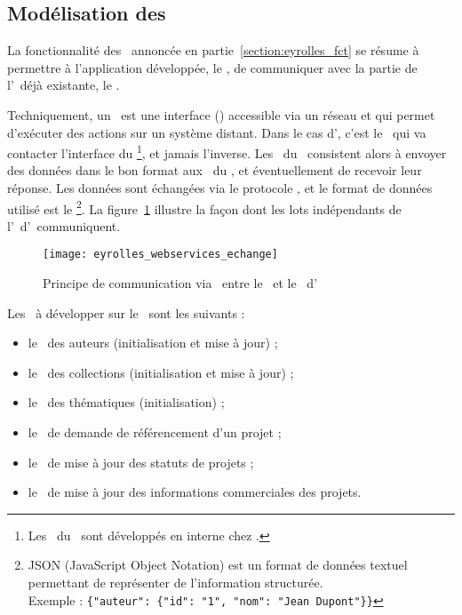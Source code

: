 \subsection{Modélisation des \awss}

La fonctionnalité des \awss\ annoncée en partie~\ref{section:eyrolles_fct} se résume à permettre à l'application développée, le \alotdeux, de communiquer avec la partie de l'\aintranet\ déjà existante, le \alotun.

Techniquement, un \aws\ est une interface (\aapi) accessible via un réseau et qui permet d'exécuter des actions sur un système distant. Dans le cas d'\aey, c'est le \alotdeux\ qui va contacter l'interface du \alotun\footnote{Les \awss\ du \alotun\ sont développés en interne chez \aey.}, et jamais l'inverse. Les \awss\ du \alotdeux\ consistent alors à envoyer des données dans le bon format aux \awss\ du \alotun, et éventuellement de recevoir leur réponse. Les données sont échangées via le protocole \ahttp, et le format de données utilisé est le \ajson\footnote{JSON (JavaScript Object Notation) est un format de données textuel permettant de représenter de l'information structurée.\\Exemple : \texttt{\{"auteur": \{"id": "1", "nom": "Jean Dupont"\}\}}}. La figure~\ref{figure:eyrolles_webservices_echange} illustre la façon dont les lots indépendants de l'\aintranet\ d'\aey\ communiquent.

\begin{figure}
	\centering
	\texttt{[image: eyrolles\_webservices\_echange]}
	\caption{Principe de communication via \aws\ entre le \alotun\ et le \alotdeux\ d'\aey}
	\label{figure:eyrolles_webservices_echange}
\end{figure}

Les \awss\ à développer sur le \alotdeux\ sont les suivants :

\begin{itemize}
	\item le \aws\ des auteurs (initialisation et mise à jour) ;
	\item le \aws\ des collections (initialisation et mise à jour) ;
	\item le \aws\ des thématiques (initialisation) ;
	\item le \aws\ de demande de référencement d'un projet ;
	\item le \aws\ de mise à jour des statuts de projets ;
	\item le \aws\ de mise à jour des informations commerciales des projets.
\end{itemize}

